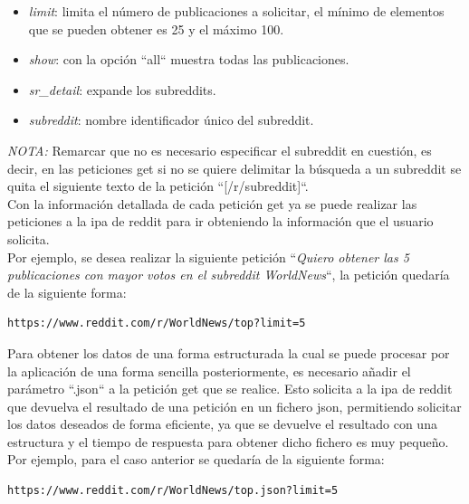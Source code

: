 \documentclass[../../main.tex]{subfiles}
\begin{document}
\begin{itemize}
\begin{itemize}
\begin{itemize}
            \item  \textit{limit}: limita el número de publicaciones a solicitar, el mínimo de elementos que se pueden obtener es 25 y el máximo 100.
            
            \item  \textit{show}: con la opción ``all`` muestra todas las publicaciones.
            
            \item  \textit{sr\_detail}: expande los \glspl{subreddit}.
            
            \item  \textit{subreddit}: nombre identificador único del \gls{subreddit}.
        \end{itemize}
    \end{itemize}
    
\end{itemize}

\textit{NOTA: } Remarcar que no es necesario especificar el \gls{subreddit} en cuestión, es decir, en las peticiones \gls{get} si no se quiere delimitar la búsqueda a un \gls{subreddit} se quita el siguiente texto de la petición ``[/r/subreddit]``. \\

Con la información detallada de cada petición \gls{get} ya se puede realizar las peticiones a la \gls{ipa} de \Gls{reddit} para ir obteniendo la información que el usuario solicita.\\
Por ejemplo, se desea realizar la siguiente petición ``\textit{Quiero obtener las 5 publicaciones con mayor votos en el subreddit WorldNews}``, la petición quedaría de la siguiente forma:
\begin{lstlisting}
https://www.reddit.com/r/WorldNews/top?limit=5
\end{lstlisting}

\vskip 0.2in

Para obtener los datos de una forma estructurada la cual se puede procesar por la aplicación de una forma sencilla posteriormente, es necesario añadir el parámetro ``.json`` a la petición \gls{get} que se realice. Esto solicita a la \gls{ipa} de \Gls{reddit} que devuelva el resultado de una petición en un fichero \gls{json}, permitiendo solicitar los datos deseados de forma eficiente, ya que se devuelve el resultado con una estructura y el tiempo de respuesta para obtener dicho fichero es muy pequeño. \\
Por ejemplo, para el caso anterior se quedaría de la siguiente forma:
\begin{lstlisting}
https://www.reddit.com/r/WorldNews/top.json?limit=5
\end{lstlisting}
\end{document}
